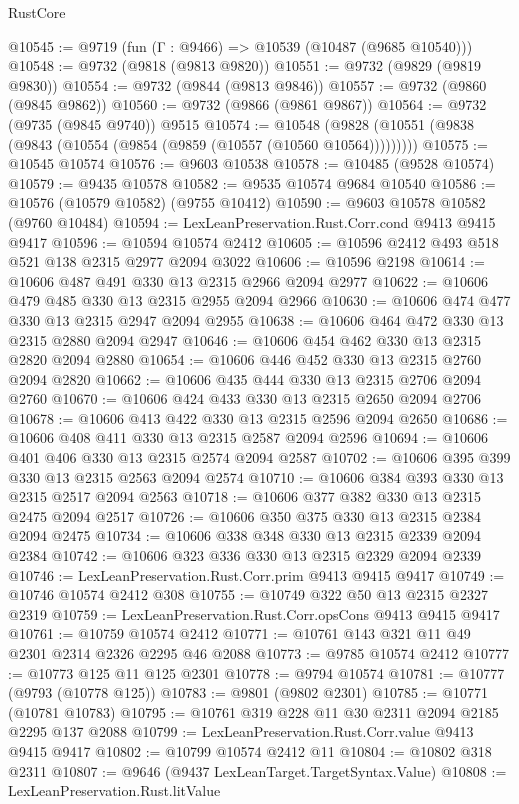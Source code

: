 \begin{lexlean}{RustCore}
\begin{coremodule}
@10545 := @9719 (fun (Γ : @9466) => @10539 (@10487 (@9685 @10540)))
@10548 := @9732 (@9818 (@9813 @9820))
@10551 := @9732 (@9829 (@9819 @9830))
@10554 := @9732 (@9844 (@9813 @9846))
@10557 := @9732 (@9860 (@9845 @9862))
@10560 := @9732 (@9866 (@9861 @9867))
@10564 := @9732 (@9735 (@9845 @9740)) @9515
@10574 := @10548 (@9828 (@10551 (@9838 (@9843 (@10554 (@9854 (@9859 (@10557 (@10560 @10564)))))))))
@10575 := @10545 @10574
@10576 := @9603 @10538
@10578 := @10485 (@9528 @10574)
@10579 := @9435 @10578
@10582 := @9535 @10574 @9684 @10540
@10586 := @10576 (@10579 @10582) (@9755 @10412)
@10590 := @9603 @10578 @10582 (@9760 @10484)
@10594 := LexLeanPreservation.Rust.Corr.cond @9413 @9415 @9417
@10596 := @10594 @10574 @2412
@10605 := @10596 @2412 @493 @518 @521 @138 @2315 @2977 @2094 @3022
@10606 := @10596 @2198
@10614 := @10606 @487 @491 @330 @13 @2315 @2966 @2094 @2977
@10622 := @10606 @479 @485 @330 @13 @2315 @2955 @2094 @2966
@10630 := @10606 @474 @477 @330 @13 @2315 @2947 @2094 @2955
@10638 := @10606 @464 @472 @330 @13 @2315 @2880 @2094 @2947
@10646 := @10606 @454 @462 @330 @13 @2315 @2820 @2094 @2880
@10654 := @10606 @446 @452 @330 @13 @2315 @2760 @2094 @2820
@10662 := @10606 @435 @444 @330 @13 @2315 @2706 @2094 @2760
@10670 := @10606 @424 @433 @330 @13 @2315 @2650 @2094 @2706
@10678 := @10606 @413 @422 @330 @13 @2315 @2596 @2094 @2650
@10686 := @10606 @408 @411 @330 @13 @2315 @2587 @2094 @2596
@10694 := @10606 @401 @406 @330 @13 @2315 @2574 @2094 @2587
@10702 := @10606 @395 @399 @330 @13 @2315 @2563 @2094 @2574
@10710 := @10606 @384 @393 @330 @13 @2315 @2517 @2094 @2563
@10718 := @10606 @377 @382 @330 @13 @2315 @2475 @2094 @2517
@10726 := @10606 @350 @375 @330 @13 @2315 @2384 @2094 @2475
@10734 := @10606 @338 @348 @330 @13 @2315 @2339 @2094 @2384
@10742 := @10606 @323 @336 @330 @13 @2315 @2329 @2094 @2339
@10746 := LexLeanPreservation.Rust.Corr.prim @9413 @9415 @9417
@10749 := @10746 @10574 @2412 @308
@10755 := @10749 @322 @50 @13 @2315 @2327 @2319
@10759 := LexLeanPreservation.Rust.Corr.opsCons @9413 @9415 @9417
@10761 := @10759 @10574 @2412
@10771 := @10761 @143 @321 @11 @49 @2301 @2314 @2326 @2295 @46 @2088
@10773 := @9785 @10574 @2412
@10777 := @10773 @125 @11 @125 @2301
@10778 := @9794 @10574
@10781 := @10777 (@9793 (@10778 @125))
@10783 := @9801 (@9802 @2301)
@10785 := @10771 (@10781 @10783)
@10795 := @10761 @319 @228 @11 @30 @2311 @2094 @2185 @2295 @137 @2088
@10799 := LexLeanPreservation.Rust.Corr.value @9413 @9415 @9417
@10802 := @10799 @10574 @2412 @11
@10804 := @10802 @318 @2311
@10807 := @9646 (@9437 LexLeanTarget.TargetSyntax.Value)
@10808 := LexLeanPreservation.Rust.litValue

\end{coremodule}
\end{lexlean}
